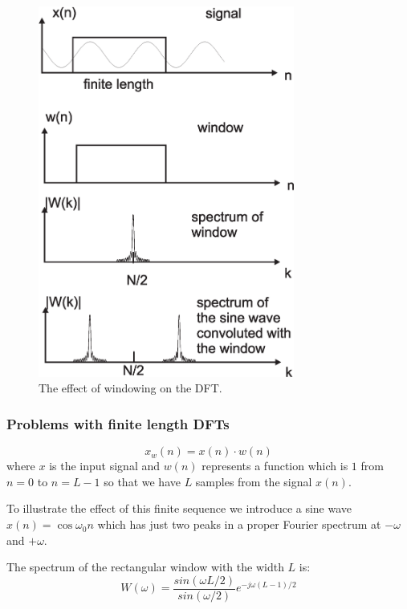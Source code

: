 \documentclass[12pt,a4paper]{article}
\begin{document}
\begin{figure}[!hbt]
\begin{center}
\mbox{\includegraphics[width=0.75\textwidth]{windowing_dft}}
\end{center}
\caption{The effect of windowing on the DFT.
\label{windowing_dft}}
\end{figure}




\subsubsection{Problems with finite length DFTs}
\begin{equation}
x_w(n) = x(n) \cdot w(n)
\end{equation}
where $x$ is the input signal and $w(n)$ represents a function
which is $1$ from $n=0$ to $n=L-1$ so that we have $L$ samples
from the signal $x(n)$.

To illustrate the effect of this finite sequence we introduce a sine
wave $x(n) = \cos \omega_0 n$ which has just two peaks in a proper
Fourier spectrum at $-\omega$ and $+\omega$.

The spectrum of the rectangular window with the width $L$ is:
\begin{equation} 
W(\omega) = \frac{sin(\omega L /2)}{sin (\omega / 2)} e^{-j\omega (L -1)/2}
\end{equation}
\end{document}
